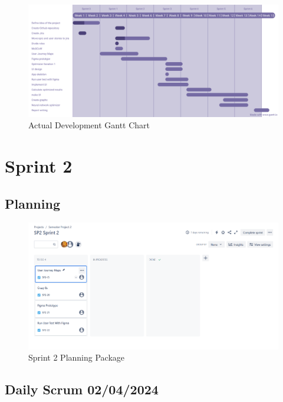 \documentclass[12pt]{report}
\begin{document}
\begin{figure}[H]
  \centering
  \includegraphics[width=1\textwidth]{Resources/1-Sprint/Gantt-Chart-Actual.png}
  \caption{Actual Development Gantt Chart}
  \label{fig:ActGanttChart}
\end{figure}

\clearpage





\section{Sprint 2}
\subsection*{Planning}
\begin{figure}[H]
  \centering
  \includegraphics[width=1\textwidth]{Resources/2-Sprint/Planning/Sprint2_Planning_Package.png}
  \caption{Sprint 2 Planning Package}
  \label{fig:S2Planning}
\end{figure}

\subsection*{Daily Scrum 02/04/2024}
\end{document}
